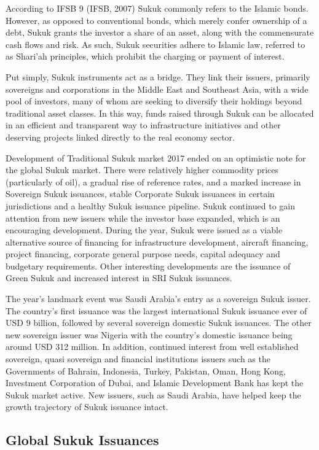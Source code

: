 \documentclass[a4paper,11pt]{article}
\begin{document}
According to IFSB 9 (IFSB, 2007) Sukuk commonly refers to the Islamic bonds. However, as opposed to conventional bonds, which merely confer ownership of a debt, Sukuk grants the investor a share of an asset, along with the commensurate cash flows and risk. As such, Sukuk securities adhere to Islamic law, referred to as Shari’ah principles, which prohibit the charging or payment of interest.

Put simply, Sukuk instruments act as a bridge. They link their issuers, primarily sovereigns and corporations in the Middle East and Southeast Asia, with a wide pool of investors, many of whom are seeking to diversify their holdings beyond traditional asset classes. In this way, funds raised through Sukuk can be allocated in an efficient and transparent way to infrastructure initiatives and other deserving projects linked directly to the real economy sector.

Development of Traditional Sukuk market 2017 ended on an optimistic note for the global Sukuk market. There were relatively higher commodity prices (particularly of oil), a gradual rise of reference rates, and a marked increase in Sovereign Sukuk issuances, stable Corporate Sukuk issuances in certain jurisdictions and a healthy Sukuk issuance pipeline. Sukuk continued to gain attention from new issuers while the investor base expanded, which is an encouraging development. During the year, Sukuk were issued as a viable alternative source of financing for infrastructure development, aircraft financing, project financing, corporate general purpose needs, capital adequacy and budgetary requirements. Other interesting developments are the issuance of Green Sukuk and increased interest in SRI Sukuk issuances.

The year’s landmark event was Saudi Arabia’s entry as a sovereign Sukuk issuer. The country’s first issuance was the largest international Sukuk issuance ever of USD 9 billion, followed by several sovereign domestic Sukuk issuances. The other new sovereign issuer was Nigeria with the country’s domestic issuance being around USD 312 million. In addition, continued interest from well established sovereign, quasi sovereign and financial institutions issuers such as the Governments of Bahrain, Indonesia, Turkey, Pakistan, Oman, Hong Kong, Investment Corporation of Dubai, and Islamic Development Bank has kept the Sukuk market active. New issuers, such as Saudi Arabia, have helped keep the growth trajectory of Sukuk issuance intact.

\subsection{Global Sukuk Issuances}
\end{document}
